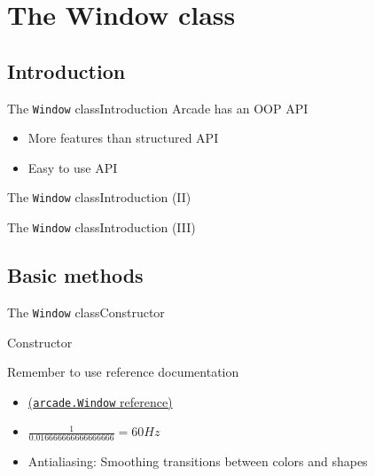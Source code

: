 \documentclass[10pt,compress]{beamer} %
\begin{document}
\section{The Window class}
\subsection{Introduction}

\begin{frame}{The \texttt{Window} class}{Introduction}
	Arcade has an OOP API
	\begin{itemize}
		\item More features than structured API
		\item Easy to use API
	\end{itemize}
\end{frame}

\begin{frame}{The \texttt{Window} class}{Introduction (II)}
	\begin{exampleblock}{}
		\vspace{-0.2cm}
		
		\vspace{-0.2cm}
	\end{exampleblock}
\end{frame}

\begin{frame}{The \texttt{Window} class}{Introduction (III)}
	\begin{exampleblock}{}
		\vspace{-0.2cm}
		
		\vspace{-0.2cm}
	\end{exampleblock}
\end{frame}

\subsection{Basic methods}

\begin{frame}{The \texttt{Window} class}{Constructor}
	\begin{block}{Constructor}
		\vspace{-0.2cm}
		
		\vspace{-0.2cm}
	\end{block}	

    Remember to use reference documentation
	\begin{itemize}
		\item \href{https://api.arcade.academy/en/2.6.17/api/window.html\#arcade.Window}{(\texttt{arcade.Window} reference)}
        \item $\frac{1}{0.016666666666666666} = 60 Hz$
        \item Antialiasing: Smoothing transitions between colors and shapes
	\end{itemize}

\end{frame}
\end{document}
